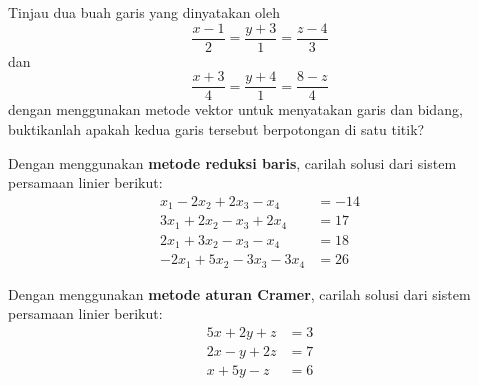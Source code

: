 \documentclass[12pt]{article}
\newenvironment{problem}[2][Problem]{\begin{trivlist}
		\item[\hskip \labelsep {\bfseries #1}\hskip \labelsep {\bfseries #2.}]}{\end{trivlist}}
\begin{document}
	\begin{problem}[Soal]{2}%
		Tinjau dua buah garis yang dinyatakan oleh
		\begin{equation*}
			\frac{x-1}{2}=\frac{y+3}{1}=\frac{z-4}{3}
		\end{equation*}
		dan
		\begin{equation*}
			\frac{x+3}{4}=\frac{y+4}{1}=\frac{8-z}{4}
		\end{equation*}
		dengan menggunakan metode vektor untuk menyatakan garis dan bidang, buktikanlah apakah kedua garis tersebut berpotongan di satu titik?
	\end{problem}
	
	\begin{problem}[Soal]{3}%
		Dengan menggunakan \textbf{metode reduksi baris}, carilah solusi dari sistem persamaan linier berikut:
		\begin{equation*}
			\begin{split}
				x_1-2x_2+2x_3-x_4 &= -14\\
				3x_1+2x_2-x_3+2x_4 &= 17\\
				2x_1+3x_2-x_3-x_4 &= 18\\
				-2x_1+5x_2-3x_3-3x_4 &= 26
			\end{split}
		\end{equation*}
	\end{problem}
	
	\begin{problem}[Soal]{4}%
		Dengan menggunakan \textbf{metode aturan Cramer}, carilah solusi dari sistem persamaan linier berikut:
		\begin{equation*}
			\begin{split}
				5x+2y+z &= 3\\
				2x-y+2z &= 7\\
				x+5y-z &= 6
			\end{split}
		\end{equation*}
	\end{problem}
	
	
	
	
\end{document}
